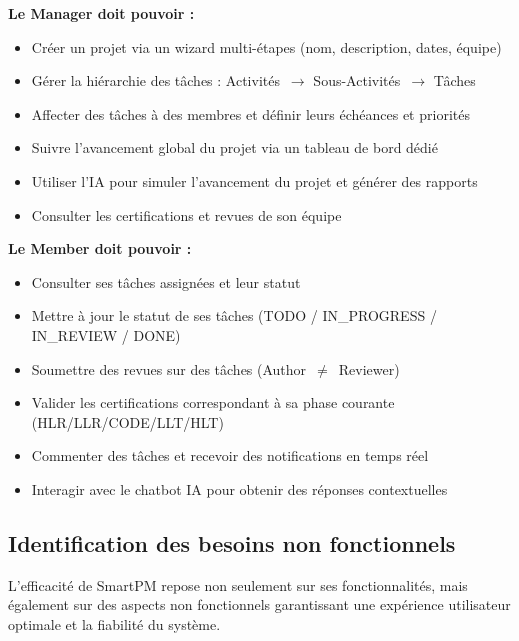 \vspace{0.3cm}
\textbf{Le Manager doit pouvoir :}
\begin{itemize}
  \item Créer un projet via un wizard multi-étapes (nom, description, dates, équipe)
  \item Gérer la hiérarchie des tâches : Activités~$\rightarrow$ Sous-Activités~$\rightarrow$ Tâches
  \item Affecter des tâches à des membres et définir leurs échéances et priorités
  \item Suivre l'avancement global du projet via un tableau de bord dédié
  \item Utiliser l'IA pour simuler l'avancement du projet et générer des rapports
  \item Consulter les certifications et revues de son équipe
\end{itemize}

\vspace{0.3cm}
\textbf{Le Member doit pouvoir :}
\begin{itemize}
  \item Consulter ses tâches assignées et leur statut
  \item Mettre à jour le statut de ses tâches (TODO / IN\_PROGRESS / IN\_REVIEW / DONE)
  \item Soumettre des revues sur des tâches (Author~$\neq$~Reviewer)
  \item Valider les certifications correspondant à sa phase courante (HLR/LLR/CODE/LLT/HLT)
  \item Commenter des tâches et recevoir des notifications en temps réel
  \item Interagir avec le chatbot IA pour obtenir des réponses contextuelles
\end{itemize}

\subsection{Identification des besoins non fonctionnels}

L'efficacité de SmartPM repose non seulement sur ses fonctionnalités, mais également sur
des aspects non fonctionnels garantissant une expérience utilisateur optimale et la fiabilité
du système.

